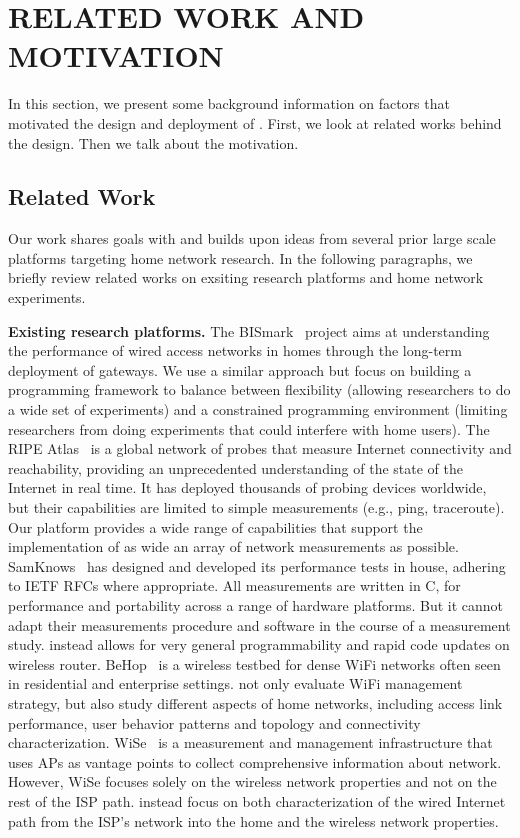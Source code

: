 \chapter{RELATED WORK AND MOTIVATION}
\label{sec.relatedwork_motivation}
In this section, we present some background information on factors that motivated the design and deployment of \sysname. First, we look at related works behind the design. Then we talk about the motivation.
\section{Related Work}
\label{ssec.related_work}
Our work shares goals with and builds upon ideas from several prior large scale platforms targeting home network research. In the following paragraphs, we briefly review related works on exsiting research platforms and home network experiments.  

\textbf{Existing research platforms. }The BISmark~\cite{183951} project aims at understanding the performance of wired access networks in homes through the long-term deployment of gateways. We use a similar approach but focus on building a programming framework to balance between flexibility (allowing researchers to do a wide set of experiments) and a constrained programming environment (limiting researchers from doing experiments that could interfere with home users). The RIPE Atlas~\cite{ripeatlas} is a global network of probes that measure Internet connectivity and reachability, providing an unprecedented understanding of the state of the Internet in real time. It has deployed thousands of probing devices worldwide, but their capabilities are limited to simple measurements (e.g., ping, traceroute). Our platform provides a wide range of capabilities that support the implementation of as wide an array of network measurements as possible. SamKnows~\cite{samknows} has designed and developed its performance tests in house, adhering to IETF RFCs where appropriate. All measurements are written in C, for performance and portability across a range of hardware platforms. But it cannot adapt their measurements procedure and software in the course of a measurement study. \sysname instead allows for very general programmability and rapid code updates on wireless router. BeHop~\cite{yiakoumis2014behop} is a wireless testbed for dense WiFi networks often seen in residential and enterprise settings. \sysname not only evaluate WiFi management strategy, but also study different aspects of home networks, including access link performance, user behavior patterns and topology and connectivity characterization. WiSe~\cite{patro2013observing} is a measurement and management infrastructure that uses APs as vantage points to collect comprehensive information about network. However, WiSe focuses solely on the wireless network properties and not on the rest of the ISP path. \sysname instead focus on both characterization of the wired Internet path from the ISP’s network into the home and the wireless network properties.

